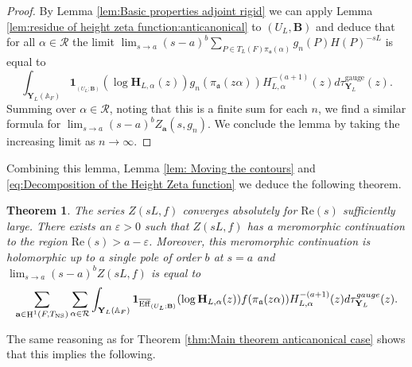 \documentclass[a4paper,11pt,reqno]{amsart}
\newcommand{\A}{\mathbb{A}}
\DeclareMathOperator{\NS}{NS}
\DeclareMathOperator{\Eff}{\overline{Eff}}
\DeclareMathOperator{\HH}{H}
\renewcommand{\Re}{\mathrm{Re}}
\newtheorem{theorem}{Theorem}[section]
\theoremstyle{definition}
\begin{document}
\begin{proof}
	By Lemma \ref{lem:Basic properties adjoint rigid} we can apply Lemma \ref{lem:residue of height zeta function:anticanonical} to $(U_L, \mathbf{B})$ and deduce that for all $\alpha \in \mathcal{R}$ the limit $\lim_{s \to a}(s - a)^b\sum_{P \in T_L(F)\pi_{\mathfrak{a}}(\alpha)} g_n(P) H(P)^{-s L}$ is equal to 
	\[
	\int_{\mathbf{Y}_L(\A_F)} \mathbf{1}_{\Eff_{(U_L ; \mathbf{B})}}(\log \mathbf{H}_{L, \alpha}(z)) g_n(\pi_{\mathfrak{a}}(z \alpha)) H_{L, \alpha}^{-(a + 1)}(z) d\tau_{\mathbf{Y}_L}^{\text{gauge}}(z).
	\] 
	Summing over $\alpha \in \mathcal{R}$, noting that this is a finite sum for each $n$, we find a similar formula for $\lim_{s \to a} (s - a)^bZ_{\mathbf{a}}(s, g_n)$. We conclude the lemma by taking the increasing limit as $n \to \infty$.
\end{proof}

Combining this lemma, Lemma \ref{lem: Moving the contours} and \eqref{eq:Decomposition of the Height Zeta function} we deduce the following theorem.
\begin{theorem}
	The series $Z(s L, f)$ converges absolutely for $\Re(s)$ sufficiently large. There exists an $\varepsilon > 0$ such that $Z(s L, f)$ has a meromorphic continuation to the region $\Re(s) > a - \varepsilon$. Moreover, this meromorphic continuation is holomorphic up to a single pole of order $b$ at $s = a$ and $\lim_{s \to a} (s - a)^bZ(s L, f)$ is equal to
	\[
	\sum_{\mathbf{a} \in \HH^1(F, T_{\NS})} \sum_{\alpha \in \mathcal{R}} \int_{\mathbf{Y}_L(\A_F)} \mathbf{1}_{\Eff_{(U_L ; \mathbf{B})}}(\log \mathbf{H}_{L, \alpha}(z)) f(\pi_{\mathfrak{a}}(z \alpha)) H_{L, \alpha}^{-(a + 1)}(z) d\tau_{\mathbf{Y}_L}^{\emph{gauge}}(z).
	\]
\end{theorem}
The same reasoning as for Theorem \ref{thm:Main theorem anticanonical case} shows that this implies the following.
\end{document}

